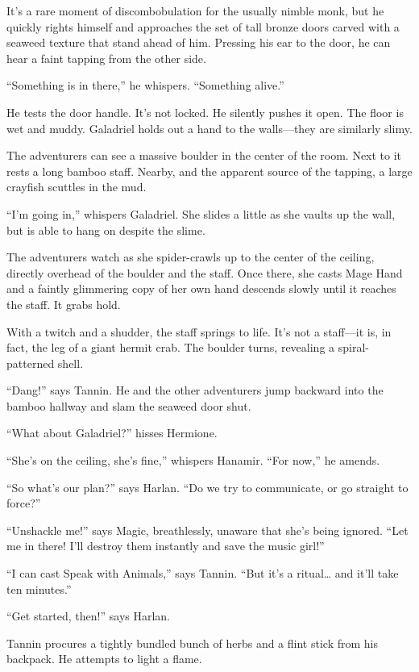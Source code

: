 \documentclass[smalldemyvopaper,11pt,twoside,onecolumn,openright,extrafontsizes]{memoir}
\begin{document}
It's a rare moment of discombobulation for the usually nimble monk, but
he quickly rights himself and approaches the set of tall bronze doors
carved with a seaweed texture that stand ahead of him. Pressing his ear
to the door, he can hear a faint tapping from the other side.

``Something is in there,'' he whispers. ``Something alive.''

He tests the door handle. It's not locked. He silently pushes it open.
The floor is wet and muddy. Galadriel holds out a hand to the
walls---they are similarly slimy.

The adventurers can see a massive boulder in the center of the room.
Next to it rests a long bamboo staff. Nearby, and the apparent source of
the tapping, a large crayfish scuttles in the mud.

``I'm going in,'' whispers Galadriel. She slides a little as she vaults
up the wall, but is able to hang on despite the slime.

The adventurers watch as she spider-crawls up to the center of the
ceiling, directly overhead of the boulder and the staff. Once there, she
casts Mage Hand and a faintly glimmering copy of her own hand descends
slowly until it reaches the staff. It grabs hold.

With a twitch and a shudder, the staff springs to life. It's not a
staff---it is, in fact, the leg of a giant hermit crab. The boulder
turns, revealing a spiral-patterned shell.

``Dang!'' says Tannin. He and the other adventurers jump backward into
the bamboo hallway and slam the seaweed door shut.

``What about Galadriel?'' hisses Hermione.

``She's on the ceiling, she's fine,'' whispers Hanamir. ``For now,'' he
amends.

``So what's our plan?'' says Harlan. ``Do we try to communicate, or go
straight to force?''

``Unshackle me!'' says Magic, breathlessly, unaware that she's being
ignored. ``Let me in there! I'll destroy them instantly and save the
music girl!''

``I can cast Speak with Animals,'' says Tannin. ``But it's a
ritual\ldots{} and it'll take ten minutes.''

``Get started, then!'' says Harlan.

Tannin procures a tightly bundled bunch of herbs and a flint stick from
his backpack. He attempts to light a flame.
\end{document}
